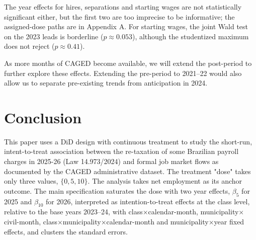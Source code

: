 \documentclass[12pt,a4paper]{article}
\begin{document}
The year effects for hires, separations and starting wages are not statistically significant either, but the first two are too imprecise to be informative; the assigned-dose paths are in Appendix A. For starting wages, the joint Wald test on the 2023 leads is borderline ($p\approx0.053$), although the studentized maximum does not reject ($p\approx0.41$).

As more months of CAGED become available, we will extend the post-period to further explore these effects. Extending the pre-period to 2021--22 would also allow us to separate pre-existing trends from anticipation in 2024.

\section{Conclusion}
\label{sec:conclusion}

This paper uses a DiD design with continuous treatment to study the short-run, intent-to-treat association between the re-taxation of some Brazilian payroll charges in 2025-26 (Law 14.973/2024) and formal job market flows as documented by the CAGED administrative dataset. The treatment "dose" takes only three values, $\{0, 5, 10\}$. The analysis takes net employment as its anchor outcome. The main specification saturates the dose with two year effects, $\beta_5$ for 2025 and $\beta_{10}$ for 2026, interpreted as intention-to-treat effects at the class level, relative to the base years 2023--24, with class$\times$calendar-month, municipality$\times$civil-month, class$\times$municipality$\times$calendar-month and municipality$\times$year fixed effects, and clusters the standard errors.
\end{document}
